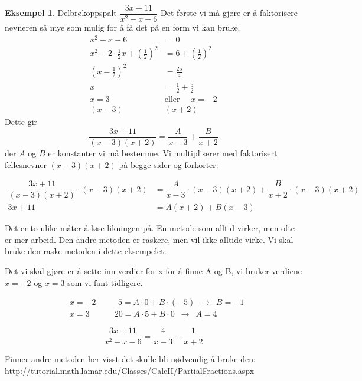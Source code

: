\documentclass[11pt]{article}
\theoremstyle{definition}
\theoremstyle{definition}
\newtheorem{mitteks}{Eksempel}[section]
\theoremstyle{definition}
\theoremstyle{definition}
\theoremstyle{definition}
\theoremstyle{definition}
\begin{document}
	\begin{mitteks}
		Delbrøkoppspalt \(\dfrac{3x+11}{x^2-x-6} \)
		Det første vi må gjøre er å faktorisere nevneren så mye som mulig for å få det på en form vi kan bruke.
		\begin{align*}
		x^2-x-6&=0\\
		x^2-2\cdot \frac{1}{2}x+\left( \frac{1}{2}\right)^2&=6+\left( \frac{1}{2}\right)^2\\
		\left(x-\frac{1}{2}\right)^2&=\frac{25}{4}\\
		x&=\frac{1}{2}\pm \frac{5}{2}\\
		x=3 \hspace{16pt}&\text{eller}\hspace{16pt}x=-2\\
		(x-3)&(x+2) 
		\end{align*}
		Dette gir
		\[\dfrac{3x+11}{(x-3)(x+2)}=\dfrac{A}{x-3}+\dfrac{B}{x+2}\]
		der \(A\) og \(B\) er konstanter vi må bestemme. Vi multipliserer med faktorisert fellesnevner \((x-3)(x+2)\) på begge sider og forkorter:
		
		\begin{align*}
		\dfrac{3x+11}{(x-3)(x+2)}\cdot (x-3)(x+2) &=\dfrac{A}{x-3}\cdot (x-3)(x+2)+\dfrac{B}{x+2} \cdot (x-3)(x+2)\\
		3x+11&=A(x+2)+B(x-3)
		\end{align*}
		
		Det er to ulike måter å løse likningen på. En metode som alltid virker, men ofte er mer arbeid. Den andre metoden er raskere, men vil ikke alltide virke. Vi skal bruke den raske metoden i dette eksempelet.
		
		Det vi skal gjøre er å sette inn verdier for x for å finne A og B, vi bruker verdiene \(x=-2\) og \(x=3\) som vi fant tidligere.
		
		\begin{align*}
			&x=-2\hspace{32pt} 5=A\cdot0 + B\cdot(-5)\,\,\,\rightarrow \,\,\, B=-1\\
			&x=3\hspace{36pt}20=A\cdot5+B\cdot0\,\,\,\rightarrow\,\,\, A=4 
		\end{align*}
		
		\[\dfrac{3x+11}{x^2-x-6}=\dfrac{4}{x-3}-\dfrac{1}{x+2}\]
	\end{mitteks}
	 
	 Finner andre metoden her visst det skulle bli nødvendig å bruke den: http://tutorial.math.lamar.edu/Classes/CalcII/PartialFractions.aspx
	 \newpage
	 
\end{document}
